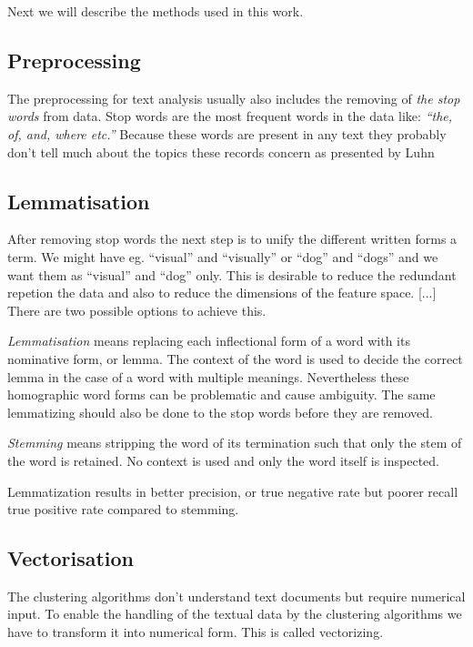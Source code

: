 Next we will describe the methods used in this work.


\subsection{Preprocessing}
The preprocessing for text analysis usually also includes the 
removing of \emph{the stop words} from data. Stop words are the 
most frequent words in the data like: \emph{``the, of, and, where 
etc.''} Because these words are present in any text they probably 
don't tell much about the topics these records concern as 
presented by Luhn \cite{luhn_key_1960}


\subsection{Lemmatisation}
After removing stop words the next step is to unify the 
different written forms a term. We might have eg. ``visual'' 
and ``visually'' or ``dog'' and ``dogs'' and we want them as 
``visual'' and ``dog'' only. This is desirable to reduce the 
redundant repetion the data and also to reduce the dimensions of 
the feature space. [...] \cite{siemens_lemmatization_1996} 
\cite{hann_towards_1975}
There are two possible options to achieve this. 

\emph{Lemmatisation} means replacing each inflectional form of a 
word with its nominative form, or lemma. The context of the word 
is used to decide the correct lemma in the case of a word with 
multiple meanings.   Nevertheless these homographic 
word forms can be problematic and cause ambiguity. The same 
lemmatizing should also be done to the stop words before they are 
removed.

\emph{Stemming} means stripping the word of its termination such 
that only the stem of the word is retained. No context is used 
and only the word itself is inspected.

Lemmatization results in better precision, or true negative rate 
but poorer recall true positive rate compared to stemming. 
\cite{ref_here}


\subsection{Vectorisation}
The clustering algorithms don't understand text documents but 
require numerical input. To enable the handling of the textual 
data by the clustering algorithms we have to transform it into 
numerical form. This is called vectorizing.

